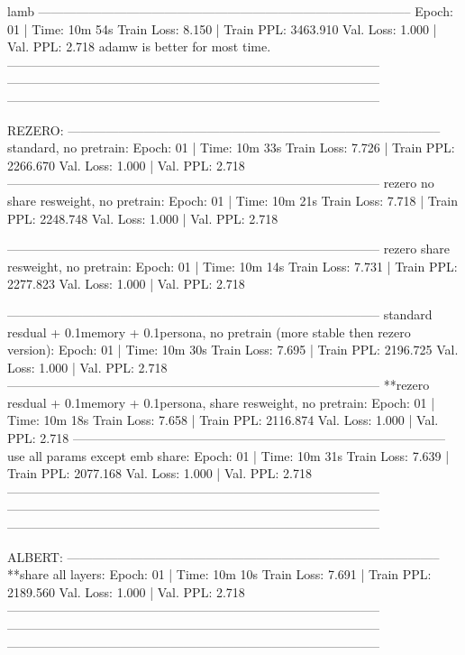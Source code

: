 \documentclass[letterpaper]{article} %
\begin{document}
\begin{CJK*}{UTF8}{gbsn}
lamb
-----------------------------------------------------------------------------------------
Epoch: 01 | Time: 10m 54s
	Train Loss: 8.150 | Train PPL: 3463.910
	 Val. Loss: 1.000 |  Val. PPL:   2.718
adamw is better for most time.
-----------------------------------------------------------------------------------------
-----------------------------------------------------------------------------------------
-----------------------------------------------------------------------------------------

REZERO:
-----------------------------------------------------------------------------------------
standard, no pretrain:
Epoch: 01 | Time: 10m 33s
	Train Loss: 7.726 | Train PPL: 2266.670
	 Val. Loss: 1.000 |  Val. PPL:   2.718
-----------------------------------------------------------------------------------------
rezero no share resweight, no pretrain:
Epoch: 01 | Time: 10m 21s
	Train Loss: 7.718 | Train PPL: 2248.748
	 Val. Loss: 1.000 |  Val. PPL:   2.718

-----------------------------------------------------------------------------------------
rezero share resweight, no pretrain:
Epoch: 01 | Time: 10m 14s
	Train Loss: 7.731 | Train PPL: 2277.823
	 Val. Loss: 1.000 |  Val. PPL:   2.718

-----------------------------------------------------------------------------------------
standard resdual + 0.1memory + 0.1persona, no pretrain (more stable then rezero version):
Epoch: 01 | Time: 10m 30s
	Train Loss: 7.695 | Train PPL: 2196.725
	 Val. Loss: 1.000 |  Val. PPL:   2.718
-----------------------------------------------------------------------------------------
**rezero resdual + 0.1memory + 0.1persona, share resweight, no pretrain:
Epoch: 01 | Time: 10m 18s
	Train Loss: 7.658 | Train PPL: 2116.874
	 Val. Loss: 1.000 |  Val. PPL:   2.718
-----------------------------------------------------------------------------------------
use all params except emb share:
Epoch: 01 | Time: 10m 31s
	Train Loss: 7.639 | Train PPL: 2077.168
	 Val. Loss: 1.000 |  Val. PPL:   2.718
-----------------------------------------------------------------------------------------
-----------------------------------------------------------------------------------------
-----------------------------------------------------------------------------------------

ALBERT:
-----------------------------------------------------------------------------------------
**share all layers:
Epoch: 01 | Time: 10m 10s
	Train Loss: 7.691 | Train PPL: 2189.560
	 Val. Loss: 1.000 |  Val. PPL:   2.718
-----------------------------------------------------------------------------------------
-----------------------------------------------------------------------------------------
-----------------------------------------------------------------------------------------


\end{CJK*}
\end{document}
